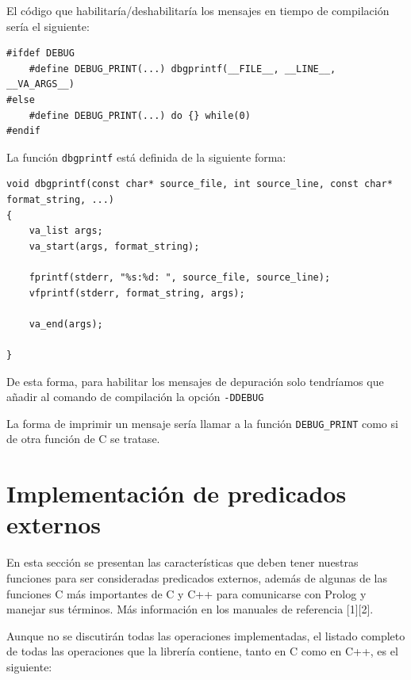\documentclass[a4paper]{article}
\begin{document}
El código que habilitaría/deshabilitaría los mensajes en tiempo de compilación sería el siguiente:

\begin{lstlisting}[style=C++]
#ifdef DEBUG
	#define DEBUG_PRINT(...) dbgprintf(__FILE__, __LINE__, __VA_ARGS__)
#else
	#define DEBUG_PRINT(...) do {} while(0)
#endif
\end{lstlisting}

La función \texttt{dbgprintf} está definida de la siguiente forma:

\begin{lstlisting}[style=C++]
void dbgprintf(const char* source_file, int source_line, const char* format_string, ...)
{
    va_list args;
    va_start(args, format_string);

    fprintf(stderr, "%s:%d: ", source_file, source_line);
    vfprintf(stderr, format_string, args);

    va_end(args);

}
\end{lstlisting}

De esta forma, para habilitar los mensajes de depuración solo tendríamos que añadir al comando de compilación la opción \texttt{-DDEBUG}

La forma de imprimir un mensaje sería llamar a la función \texttt{DEBUG\_PRINT} como si de otra función de C se tratase.


\section{Implementación de predicados externos}

En esta sección se presentan las características que deben tener nuestras funciones para ser consideradas predicados externos, además de algunas de las funciones C más importantes de C y C++ para comunicarse con Prolog y manejar sus términos. Más información en los manuales de referencia [1][2].

Aunque no se discutirán todas las operaciones implementadas, el listado completo de todas las operaciones que la librería contiene, tanto en C como en C++, es el siguiente:
\end{document}
